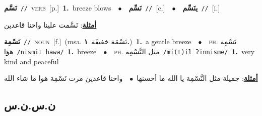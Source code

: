 \documentclass[10pt,a4paper,twoside]{article} %
\begin{document}
\begin{multicols}{2}
{\setlength\topsep{0pt}\textbf{\foreignlanguage{arabic}{نَسَّم}}\ {\color{gray}\texttt{//}\color{black}}\ \textsc{verb}\ [p.]\ \textbf{1.}~breeze blows\ \ $\bullet$\ \ \setlength\topsep{0pt}\textbf{\foreignlanguage{arabic}{نَسِّم}}\ {\color{gray}\texttt{//}\color{black}}\ [c.]\ \ $\bullet$\ \ \setlength\topsep{0pt}\textbf{\foreignlanguage{arabic}{ينَسِّم}}\ {\color{gray}\texttt{//}\color{black}}\ [i.]\  \begin{flushright}\color{gray}\foreignlanguage{arabic}{\textbf{\underline{\foreignlanguage{arabic}{أمثلة}}}: نَسَّمت علينا واحنا قاعدين}\end{flushright}\color{black}} \vspace{2mm}

{\setlength\topsep{0pt}\textbf{\foreignlanguage{arabic}{نَسْمِة}}\ {\color{gray}\texttt{//}\color{black}}\ \textsc{noun}\ [f.]\ \color{gray}(msa. \foreignlanguage{arabic}{نَسْمَة خفيفَة}~\foreignlanguage{arabic}{\textbf{١.}})\color{black}\ \textbf{1.}~a gentle breeze\ \ $\bullet$\ \ \textsc{ph.} \color{gray} \foreignlanguage{arabic}{نَسْمِة هوَا}\color{black}\ {\color{gray}\texttt{/{\sffamily nismit hawa}/}\color{black}}\ \textbf{1.}~breeze\ \ $\bullet$\ \ \textsc{ph.} \color{gray} \foreignlanguage{arabic}{مثل النَّسْمِة}\color{black}\ {\color{gray}\texttt{/{\sffamily mi(t)il ʔinnisme}/}\color{black}}\ \textbf{1.}~very kind and peaceful\  \begin{flushright}\color{gray}\foreignlanguage{arabic}{\textbf{\underline{\foreignlanguage{arabic}{أمثلة}}}: جميلة مثل النَّسْمِة يا الله ما أحسنها\ $\bullet$\ \  واحنا قاعدين مرت نَسْمِة هوا ما شاء الله}\end{flushright}\color{black}} \vspace{2mm}

\vspace{-3mm}
\subsection*{\color{blue}\foreignlanguage{arabic}{ن.س.ن.س}\color{blue}{}} 


\end{multicols}
\end{document}
